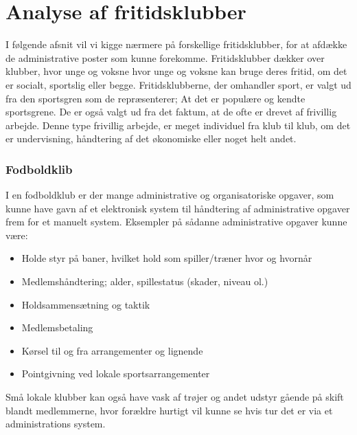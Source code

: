 \chapter{Analyse af fritidsklubber} \label{Fritidsklubber}

I følgende afsnit vil vi kigge nærmere på forskellige fritidsklubber, for at afdække de administrative poster som kunne forekomme. Fritidsklubber dækker over klubber, hvor unge og voksne hvor unge og voksne kan bruge deres fritid, om det er socialt, sportslig eller begge. Fritidsklubberne, der omhandler sport, er valgt ud fra den sportsgren som de repræsenterer; At det er populære og kendte sportsgrene. De er også valgt ud fra det faktum, at de ofte er drevet af frivillig arbejde. Denne type frivillig arbejde, er meget individuel fra klub til klub, om det er undervisning, håndtering af det økonomiske eller noget helt andet. 

\subsection{Fodboldklib} \label{Fodbold}
I en fodboldklub er der mange administrative og organisatoriske opgaver, som kunne have gavn af et elektronisk system
til håndtering af administrative opgaver frem for et manuelt system. Eksempler på sådanne
administrative opgaver kunne være:

\begin{itemize}
\item Holde styr på baner, hvilket hold som spiller/træner hvor og hvornår
\item Medlemshåndtering; alder, spillestatus (skader, niveau ol.)
\item Holdsammensætning og taktik
\item Medlemsbetaling
\item Kørsel til og fra arrangementer og lignende
\item Pointgivning ved lokale sportsarrangementer
\end{itemize}

Små lokale klubber kan også have vask af trøjer og andet udstyr gående på skift blandt medlemmerne, hvor forældre hurtigt vil kunne se hvis tur det er via et administrations system. 

